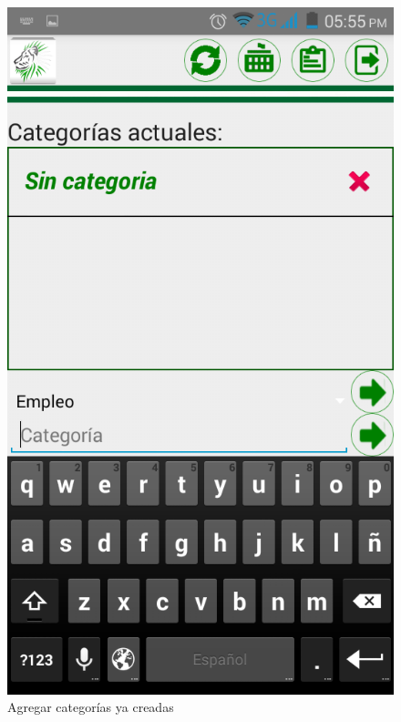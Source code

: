 \begin{figure}
\centering
\includegraphics[scale=0.5]{./android/imagenes/cat3.png}
\caption{Agregar categorías ya creadas}
\label{cat3}
\end{figure}

